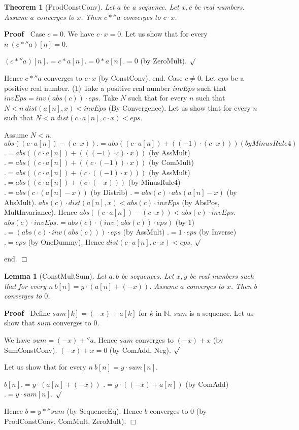 \documentclass{article}
\newenvironment{forthel}{\begin{leftbar}}{\end{leftbar}}
\newenvironment{proof}{\noindent\textbf{Proof\ }}{\hspace*{\fill}$\Box$\medskip}
\newenvironment{subproof}{\begin{list}{}{}
		\item[\text{Proof}]}{\hfill $\surd$ \end{list}}
\newtheorem{lemma}{Lemma}
\newtheorem{theorem}{Theorem}
\newcommand{\NN}{\mathbb{N}}
\begin{document}
\begin{forthel}
	\begin{theorem}[ProdConstConv]
	Let $a$ be a sequence. Let $x,c$ be real numbers. Assume $a$ converges to $x$.
	Then $c *'' a$ converges to $c \cdot x$.
	\end{theorem}
	\begin{proof}
	Case $c = 0$.
	We have $c \cdot x = 0$.
	Let us show that for every $n \ (c *'' a)[n] = 0$. 
	\begin{subproof}
	$(c *'' a)[n] .= c * a[n]
	.= 0 * a[n]
	.= 0$ (by ZeroMult).
	\end{subproof}
	Hence $c *'' a$ converges to $c \cdot x$ (by ConstConv).
	end.
	Case $c \neq 0$.
	Let $eps$ be a positive real number. 
	(1)     Take a positive real number $invEps$ such that $invEps = inv(abs(c)) \cdot eps$.
	Take $N$ such that for every $n$ such that $N < n \ dist(a[n],x) < invEps$ (By Convergence).
	Let us show that for every $n$ such that $N < n \ dist(c \cdot a[n],c \cdot x) < eps$.
	\begin{subproof}
	Assume $N < n$.
	$abs((c \cdot a[n]) - (c \cdot x)) .= abs((c \cdot a[n]) +  ((-1) \cdot (c \cdot x))) (by MinusRule4)$ 
	$.= abs((c \cdot a[n]) + (((-1) \cdot c) \cdot x))$ (by AssMult)
	$.= abs((c \cdot a[n]) + ((c \cdot (-1)) \cdot x))$ (by ComMult)
	$.= abs((c \cdot a[n]) + (c \cdot ((-1) \cdot x)))$ (by AssMult)
	$.= abs((c \cdot a[n]) + (c \cdot (-x)))$ (by MinusRule4)
	$.= abs(c \cdot (a[n] - x))$ (by Distrib)
	$.= abs(c) \cdot abs(a[n] - x)$ (by AbsMult).
	$abs(c) \cdot dist(a[n],x) < abs(c) \cdot invEps$ (by AbsPos, MultInvariance).
	Hence $abs((c \cdot a[n]) - (c \cdot x)) < abs(c) \cdot invEps$.
	$abs(c) \cdot invEps .= abs(c) \cdot (inv(abs(c)) \cdot eps)$ (by 1)
	$.= (abs(c) \cdot inv(abs(c))) \cdot eps$ (by AssMult)
	$.= 1 \cdot eps$ (by Inverse)
	$.= eps$ (by OneDummy).
	Hence $dist(c \cdot a[n],c \cdot x) < eps$.
	\end{subproof}
	end.
	\end{proof}

	\begin{lemma}[ConstMultSum]
	Let $a,b$ be sequences. Let $x,y$ be real numbers such that for every $n\ b[n] = y \cdot (a[n] + (-x))$. Assume $a$ converges to $x$.
	Then $b$ converges to $0$.
	\end{lemma}
	\begin{proof}
	Define $sum[k] = (-x) + a[k]$ for $k$ in $\NN$.
	$sum$ is a sequence.
	Let us show that $sum$ converges to $0$.
	\begin{subproof}
	We have $sum = (-x) +'' a$.
	Hence $sum$ converges to $(-x) + x$ (by SumConstConv).
	$(-x) + x = 0$ (by ComAdd, Neg).
	\end{subproof}
	Let us show that for every $n\ b[n] = y \cdot sum[n]$.
	\begin{subproof}
	$b[n] .= y \cdot (a[n] + (-x))$
	$.= y \cdot ((-x) + a[n])$ (by ComAdd)
	$.= y \cdot sum[n]$.
	\end{subproof}
	Hence $b = y *'' sum$ (by SequenceEq).
	Hence $b$ converges to $0$ (by ProdConstConv, ComMult, ZeroMult).
	\end{proof}
	

\end{forthel}
\end{document}
